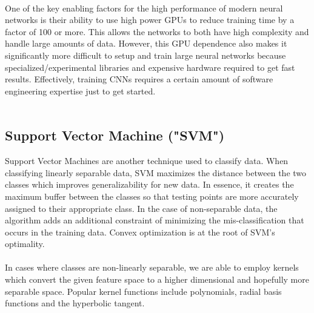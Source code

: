 \documentclass[12pt]{article}
\begin{document}
\\
One of the key enabling factors for the high performance of modern neural networks is their ability to use high power GPUs to reduce training time by a factor of 100 or more.  This allows the networks to both have high complexity and handle large amounts of data.  However, this GPU dependence also makes it significantly more difficult to setup and train large neural networks because specialized/experimental libraries and expensive hardware required to get fast results.  Effectively, training CNNs requires a certain amount of software engineering expertise just to get started.\\
\\
\subsection{Support Vector Machine ("SVM")}
Support Vector Machines are another technique used to classify data. When classifying linearly separable data, SVM maximizes the distance between the two classes which improves generalizability for new data. In essence, it creates the maximum buffer between the classes so that testing points are more accurately assigned to their appropriate class. In the case of non-separable data, the algorithm adds an additional constraint of minimizing the mis-classification that occurs in the training data. Convex optimization is at the root of SVM's optimality\cite{haykin2009neural}.\\
\\
In cases where classes are non-linearly separable, we are able to employ kernels which convert the given feature space to a higher dimensional and hopefully more separable space. Popular kernel functions include polynomials, radial basis functions and the hyperbolic tangent\cite{theodoridis2009pattern}.
\end{document}
